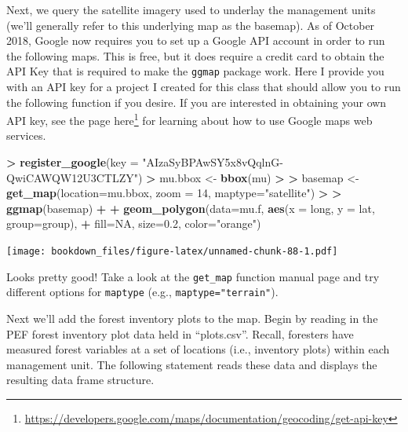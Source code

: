 \documentclass[]{krantz}
\makeatletter
\newenvironment{Shaded}{\begin{snugshade}}{\end{snugshade}}
\newcommand{\KeywordTok}[1]{\textcolor[rgb]{0.27,0.27,0.27}{\textbf{#1}}}
\newcommand{\DataTypeTok}[1]{\textcolor[rgb]{0.27,0.27,0.27}{#1}}
\newcommand{\DecValTok}[1]{\textcolor[rgb]{0.06,0.06,0.06}{#1}}
\newcommand{\FloatTok}[1]{\textcolor[rgb]{0.06,0.06,0.06}{#1}}
\newcommand{\StringTok}[1]{\textcolor[rgb]{0.5,0.5,0.5}{#1}}
\newcommand{\OtherTok}[1]{\textcolor[rgb]{0.37,0.37,0.37}{#1}}
\newcommand{\OperatorTok}[1]{\textcolor[rgb]{0.43,0.43,0.43}{\textbf{#1}}}
\newcommand{\ErrorTok}[1]{\textcolor[rgb]{0.14,0.14,0.14}{\textbf{#1}}}
\newcommand{\NormalTok}[1]{#1}
\renewcommand{\href}[2]{#2\footnote{\url{#1}}}
\newenvironment{kframe}{%
\medskip{}
\setlength{\fboxsep}{.8em}
 \def\at@end@of@kframe{}%
 \ifinner\ifhmode%
  \def\at@end@of@kframe{\end{minipage}}%
  \begin{minipage}{\columnwidth}%
 \fi\fi%
 \def\FrameCommand##1{\hskip\@totalleftmargin \hskip-\fboxsep
 \colorbox{shadecolor}{##1}\hskip-\fboxsep
     \hskip-\linewidth \hskip-\@totalleftmargin \hskip\columnwidth}%
 \MakeFramed {\advance\hsize-\width
   \@totalleftmargin\z@ \linewidth\hsize
   \@setminipage}}%
 {\par\unskip\endMakeFramed%
 \at@end@of@kframe}
\renewenvironment{Shaded}{\begin{kframe}}{\end{kframe}}
\theoremstyle{definition}
\theoremstyle{definition}
\theoremstyle{definition}
\theoremstyle{remark}
\makeatother
\begin{document}
Next, we query the satellite imagery used to underlay the management
units (we'll generally refer to this underlying map as the basemap). As
of October 2018, Google now requires you to set up a Google API account
in order to run the following maps. This is free, but it does require a
credit card to obtain the API Key that is required to make the
\texttt{ggmap} package work. Here I provide you with an API key for a
project I created for this class that should allow you to run the
following function if you desire. If you are interested in obtaining
your own API key, see the page
\href{https://developers.google.com/maps/documentation/geocoding/get-api-key}{here}
for learning about how to use Google maps web services.

\begin{Shaded}
\begin{Highlighting}[]
\OperatorTok{>}\StringTok{ }\KeywordTok{register_google}\NormalTok{(}\DataTypeTok{key =} \StringTok{"AIzaSyBPAwSY5x8vQqlnG-QwiCAWQW12U3CTLZY"}\NormalTok{)}
\OperatorTok{>}\StringTok{ }\NormalTok{mu.bbox <-}\StringTok{ }\KeywordTok{bbox}\NormalTok{(mu)}
\OperatorTok{>}\StringTok{ }
\ErrorTok{>}\StringTok{ }\NormalTok{basemap <-}\StringTok{ }\KeywordTok{get_map}\NormalTok{(}\DataTypeTok{location=}\NormalTok{mu.bbox, }\DataTypeTok{zoom =} \DecValTok{14}\NormalTok{, }\DataTypeTok{maptype=}\StringTok{"satellite"}\NormalTok{)}
\OperatorTok{>}\StringTok{ }
\ErrorTok{>}\StringTok{ }\KeywordTok{ggmap}\NormalTok{(basemap) }\OperatorTok{+}
\OperatorTok{+}\StringTok{     }\KeywordTok{geom_polygon}\NormalTok{(}\DataTypeTok{data=}\NormalTok{mu.f, }\KeywordTok{aes}\NormalTok{(}\DataTypeTok{x =}\NormalTok{ long, }\DataTypeTok{y =}\NormalTok{ lat, }\DataTypeTok{group=}\NormalTok{group), }
\OperatorTok{+}\StringTok{                  }\DataTypeTok{fill=}\OtherTok{NA}\NormalTok{, }\DataTypeTok{size=}\FloatTok{0.2}\NormalTok{, }\DataTypeTok{color=}\StringTok{"orange"}\NormalTok{)}
\end{Highlighting}
\end{Shaded}

\texttt{[image: bookdown\_files/figure-latex/unnamed-chunk-88-1.pdf]}

Looks pretty good! Take a look at the \texttt{get\_map} function manual
page and try different options for \texttt{maptype} (e.g.,
\texttt{maptype="terrain"}).

Next we'll add the forest inventory plots to the map. Begin by reading
in the PEF forest inventory plot data held in ``plots.csv''. Recall,
foresters have measured forest variables at a set of locations (i.e.,
inventory plots) within each management unit. The following statement
reads these data and displays the resulting data frame structure.
\end{document}
